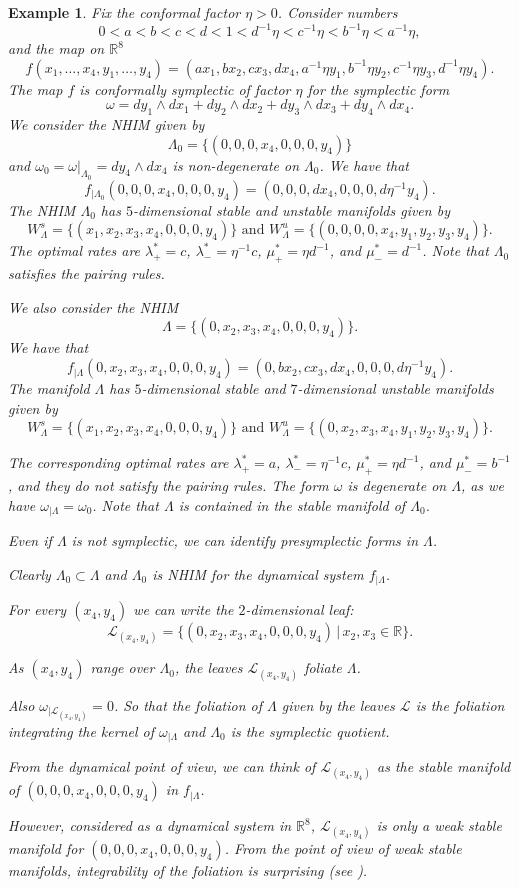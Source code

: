 \documentclass[11pt]{amsart}
\newtheorem{ex}[thm]{Example}
\theoremstyle{definition}
\theoremstyle{remark}
\numberwithin{equation}{section}
\newcommand{\R}{\mathbb R}
\def\L{{\mathcal L}}
\begin{document}
\begin{ex}
  \label{intermediatenew}
  Fix the conformal factor $\eta > 0$.
  Consider numbers \[0 < a < b < c < d  < 1 <d^{-1} \eta < c^{-1} \eta < b^{-1} \eta < a^{-1} \eta ,\]
  and the map on $\R^8$
  \[
  f(x_1,\ldots,x_4,y_1,\ldots,y_4)
  =  (a x_1,b x_2, c x_3, d x_4,  a^{-1} \eta y_1, b^{-1} \eta y_2, c^{-1} \eta y_3, d^{-1}\eta  y_4 ).
  \]
 The map $f$ is conformally symplectic of factor $\eta$
  for the symplectic form
  \[
  \omega = d y_1 \wedge dx_1 + d y_2 \wedge dx_2 + d y_3\wedge d x_3 +
 dy_4 \wedge d x_4 .
  \]
 We consider the NHIM given by
\[
\Lambda_0 = \{(0,0,0,x_4,0,0,0,y_4)\}
\]
and
$\omega_0 = \omega|_{\Lambda_0}= d y_4 \wedge d x_4 $
is non-degenerate on $\Lambda_0$.
We have that
\[f_{\mid\Lambda_0}(0,0,0,x_4,0,0,0,y_4)=(0,0,0,dx_4,0,0,0,d\eta^{-1}y_4). \]
The NHIM $\Lambda_0$ has $5$-dimensional stable and unstable manifolds given by
\[W^s_\Lambda=\{(x_1,x_2,x_3,x_4,0,0,0,y_4)\} \textrm{ and } W^u_\Lambda=\{(0,0,0,0,x_4,y_1,y_2,y_3,y_4)\}.\]
The optimal rates
are $\lambda_+^*=c$,  $\lambda_-^*=\eta^{-1}c$, $\mu_+^*=\eta d^{-1}$, and $\mu_-^*=d^{-1}$.
Note that $\Lambda_0$ satisfies the pairing rules.

We also consider the NHIM
\[
\Lambda = \{ (0,x_2,x_3,x_4,0, 0,0,y_4)\}.\]
We have that
\[f_{\mid\Lambda}(0,x_2,x_3,x_4,0,0,0,y_4)=(0,b x_2, c x_3,dx_4,0,0,0,d\eta^{-1}y_4). \]
The manifold $\Lambda$  has $5$-dimensional stable and $7$-dimensional unstable manifolds given by
\[W^s_\Lambda=\{(x_1,x_2,x_3,x_4,0,0,0,y_4)\} \textrm{ and } W^u_\Lambda=\{(0,x_2,x_3,x_4,y_1,y_2,y_3,y_4)\}.\]

The corresponding optimal rates  are $\lambda_+^*=a$,  $\lambda_-^*=\eta^{-1}c$, $\mu_+^*= \eta d^{-1}$, and $\mu_-^*=b^{-1}$, and they
do not satisfy the pairing rules.
The form $\omega$ is degenerate on $\Lambda$,  as we have $\omega_{\mid\Lambda} = \omega_0$.
Note that $\Lambda$ is contained in the stable manifold of $\Lambda_0$.


Even if $\Lambda$ is not symplectic, we can identify presymplectic forms in $\Lambda$.

Clearly $\Lambda_0 \subset \Lambda $ and $\Lambda_0$ is NHIM
for the dynamical system $f_{\mid\Lambda}$.

For every $(x_4, y_4)$
we can write the $2$-dimensional leaf:
\[
\L_{(x_4,y_4)} = \{  (0,x_2,x_3,x_4, 0, 0,0,y_4)\, |\, x_2, x_3 \in \R\}.
\]

As $(x_4, y_4)$ range over $\Lambda_0$, the leaves $\L_{(x_4, y_4)}$
foliate $\Lambda$.

Also $\omega_{\mid \L_{(x_4,y_4)}} = 0$. So that the foliation of $\Lambda$
given by the leaves $\L$ is the foliation integrating the
kernel of $\omega_{\mid\Lambda}$ and $\Lambda_0$ is the
symplectic quotient.

From the dynamical point of view,
we can think of $\L_{(x_4,y_4)}$
as the stable  manifold of $(0,0,0,x_4,0,0,0,y_4)$
in $f_{\mid\Lambda}$.

However, considered as a dynamical system in $\R^8$,
$\L_{(x_4,y_4)}$ is only a weak stable manifold for
$(0,0,0,x_4,0,0,0,y_4)$. From the point of view of weak
stable manifolds, integrability of the foliation is surprising (see \cite{JiangPL1995}).
\end{ex}
\end{document}
